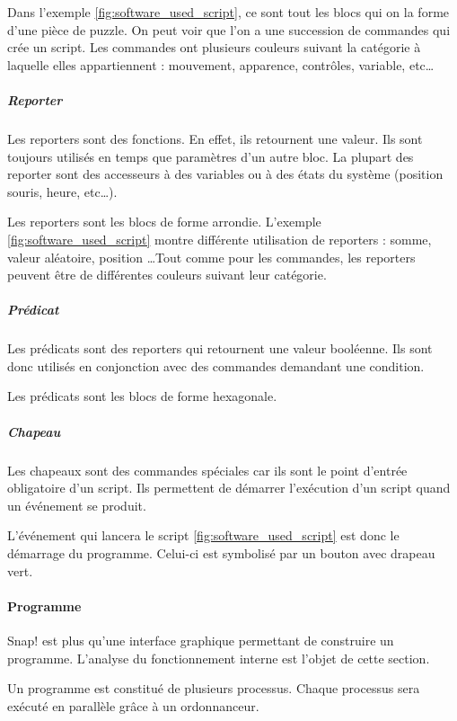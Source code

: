Dans l'exemple \ref{fig:software_used_script}, ce sont tout les blocs qui on la forme d'une pièce de puzzle. On peut voir que l'on a une succession de commandes qui crée un script. Les commandes ont plusieurs couleurs suivant la catégorie à laquelle elles appartiennent : mouvement, apparence, contrôles, variable, etc\ldots

\subparagraph{Reporter}
Les reporters sont des fonctions. En effet, ils retournent une valeur. Ils sont toujours utilisés en temps que paramètres d'un autre bloc. La plupart des reporter sont des accesseurs à des variables ou à des états du système (position souris, heure, etc\ldots). 

Les reporters sont les blocs de forme arrondie. L'exemple \ref{fig:software_used_script} montre différente utilisation de reporters : somme, valeur aléatoire, position \ldots Tout comme pour les commandes, les reporters peuvent être de différentes couleurs suivant leur catégorie.

\subparagraph{Prédicat}
Les prédicats sont des reporters qui retournent une valeur booléenne. Ils sont donc utilisés en conjonction avec des commandes demandant une condition.

Les prédicats sont les blocs de forme hexagonale.

\subparagraph{Chapeau}
Les chapeaux sont des commandes spéciales car ils sont le point d'entrée obligatoire d'un script. Ils permettent de démarrer l'exécution d'un script quand un événement se produit.

L'événement qui lancera le script \ref{fig:software_used_script} est donc le démarrage du programme. Celui-ci est symbolisé par un bouton avec drapeau vert.

\paragraph{Programme}
Snap! est plus qu'une interface graphique permettant de construire un programme. L'analyse du fonctionnement interne est l'objet de cette section.

Un programme est constitué de plusieurs processus. Chaque processus sera exécuté en parallèle grâce à un ordonnanceur.

